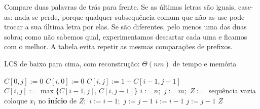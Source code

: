 \begin{intuicao}
Compare duas palavras de trás para frente. Se as últimas letras são iguais, case-as: nada se perde, porque qualquer subsequência comum que não as use pode trocar a sua última letra por elas. Se são diferentes, pelo menos uma das duas sobra; como não sabemos qual, experimentamos descartar cada uma e ficamos com o melhor. A tabela evita repetir as mesmas comparações de prefixos.
\end{intuicao}

\begin{pseudo}{LCS de baixo para cima, com reconstrução: $\Theta(nm)$ de tempo e memória}
\begin{algorithmic}
   \State $C[0,j]:=0$ \EndFor
   \State $C[i,0]:=0$ \EndFor
       \State $C[i,j]:=1+C[i-1,j-1]$
      \Else \State $C[i,j]:=\max\{C[i-1,j],\,C[i,j-1]\}$
      \EndIf
    \EndFor
  \EndFor
  \State $i:=n$;\ $j:=m$;\ $Z:=$ sequência vazia 
     \State coloque $x_i$ no \textbf{início} de $Z$;\ $i:=i-1$;\ $j:=j-1$
     \State $i:=i-1$
    \Else \State $j:=j-1$
    \EndIf
  \EndWhile
  \State \Return $Z$ 
\EndFunction
\end{algorithmic}
\end{pseudo}

